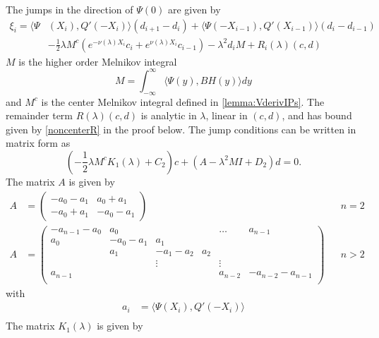 \documentclass[thesis.tex]{subfiles}
\begin{document}
\begin{lemma}\label{jumpadj}
The jumps in the direction of $\Psi(0)$ are given by
\begin{equation}\label{jumpPsi0}
\begin{aligned}
\xi_i = \langle \Psi&(X_i), Q'(-X_i) \rangle (d_{i+1} - d_i ) + \langle \Psi(-X_{i-1}), Q'(X_{i-1}) \rangle (d_i - d_{i-1} ) \\
&-\frac{1}{2}\lambda M^c\left( e^{-\nu(\lambda)X_i}c_i + e^{\nu(\lambda)X_i}c_{i-1}\right)
- \lambda^2 d_i M + R_i(\lambda)(c, d)
\end{aligned}
\end{equation}
$M$ is the higher order Melnikov integral
\begin{equation}\label{defM2}
M = \int_{-\infty}^\infty \langle \Psi(y), B H(y) \rangle dy
\end{equation}
and $M^c$ is the center Melnikov integral defined in \cref{lemma:VderivIPs}. The remainder term $R(\lambda)(c, d)$ is analytic in $\lambda$, linear in $(c, d)$, and has bound given by \cref{noncenterR} in the proof below. The jump conditions can be written in matrix form as
\begin{equation}\label{Psimatrix}
\left(-\frac{1}{2} \lambda M^c K_1(\lambda) + C_2 \right)c + (A - \lambda^2 M I + D_2)d = 0.
\end{equation}
The matrix $A$ is given by
\begin{align*}
A &= \begin{pmatrix}
-a_0 -a_1 & a_0 + a_1  \\
-a_0 + a_1 & -a_0 - a_1
\end{pmatrix} && n = 2 \\
A &= \begin{pmatrix}
-a_{n-1} - a_0 & a_0 & & & \dots & a_{n-1}\\
a_0 & -a_0 - a_1 &  a_1   \\
& a_1 & -a_1 - a_2 &  a_2 \\
& & \vdots & & \vdots \\
a_{n-1} & & & & a_{n-2} & -a_{n-2} - a_{n-1} \\
\end{pmatrix} && n > 2
\end{align*}
with
\begin{align*}
a_i &= \langle \Psi(X_i), Q'(-X_i) \rangle \\
\end{align*}
The matrix $K_1(\lambda)$ is given by
\begin{align*}

\end{align*}
\end{lemma}
\end{document}
